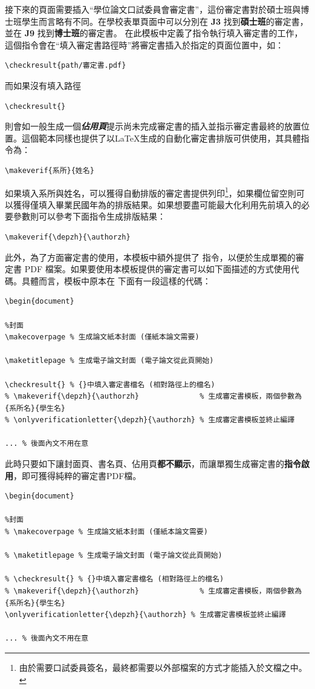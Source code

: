 \documentclass[12pt]{report}
\theoremstyle{plain}
\renewcommand{\authorzh}{佚名}
\renewcommand{\depzh}{電子工程系}
\begin{document}
接下來的頁面需要插入``學位論文口試委員會審定書''，這份審定書對於碩士班與博士班學生而言略有不同。在學校表單頁面\cite{ntutsheet}中可以分別在 \textbf{J3} 找到\textbf{碩士班}的審定書，並在 \textbf{J9} 找到\textbf{博士班}的審定書。
在此模板中定義了指令執行填入審定書的工作，這個指令會在``填入審定書路徑時''將審定書插入於指定的頁面位置中，如：
\begin{lstlisting}
\checkresult{path/審定書.pdf}
\end{lstlisting}
而如果沒有填入路徑
\begin{lstlisting}
\checkresult{}
\end{lstlisting}
則會如一般生成一個\textbf{\textit{佔用頁}}提示尚未完成審定書的插入並指示審定書最終的放置位置。這個範本同樣也提供了以\LaTeX 生成的自動化審定書排版可供使用，其具體指令為：
\begin{lstlisting}
\makeverif{系所}{姓名}
\end{lstlisting}
如果填入系所與姓名，可以獲得自動排版的審定書提供列印\footnote{由於需要口試委員簽名，最終都需要以外部檔案的方式才能插入於文檔之中。}，如果欄位留空則可以獲得僅填入畢業民國年為的排版結果。如果想要盡可能最大化利用先前填入的必要參數則可以參考下面指令生成排版結果：
\begin{lstlisting}
\makeverif{\depzh}{\authorzh}
\end{lstlisting}
此外，為了方面審定書的使用，本模板中額外提供了  指令，以便於生成單獨的審定書 PDF 檔案。如果要使用本模板提供的審定書可以如下面描述的方式使用代碼。具體而言，模板中原本在  下面有一段這樣的代碼：
\begin{lstlisting}
\begin{document}

%封面
\makecoverpage % 生成論文紙本封面 (僅紙本論文需要)

\maketitlepage % 生成電子論文封面 (電子論文從此頁開始)

\checkresult{} % {}中填入審定書檔名 (相對路徑上的檔名)
% \makeverif{\depzh}{\authorzh}              % 生成審定書模板，兩個參數為 {系所名}{學生名}
% \onlyverificationletter{\depzh}{\authorzh} % 生成審定書模板並終止編譯

... % 後面內文不用在意
\end{lstlisting}
此時只要如下讓封面頁、書名頁、佔用頁\textbf{都不顯示}，而讓單獨生成審定書的\textbf{指令啟用}，即可獲得純粹的審定書PDF檔。
\begin{lstlisting}
\begin{document}

%封面
% \makecoverpage % 生成論文紙本封面 (僅紙本論文需要)

% \maketitlepage % 生成電子論文封面 (電子論文從此頁開始)

% \checkresult{} % {}中填入審定書檔名 (相對路徑上的檔名)
% \makeverif{\depzh}{\authorzh}              % 生成審定書模板，兩個參數為 {系所名}{學生名}
\onlyverificationletter{\depzh}{\authorzh} % 生成審定書模板並終止編譯

... % 後面內文不用在意
\end{lstlisting}
\end{document}

